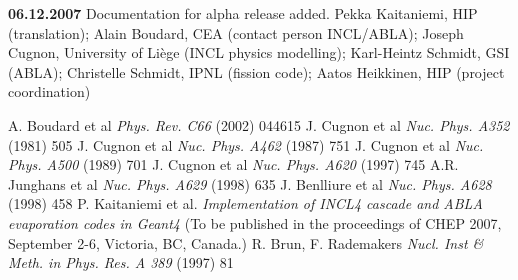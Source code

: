 {\bf 06.12.2007} Documentation for alpha release added. Pekka
Kaitaniemi, HIP (translation); Alain Boudard, CEA (contact person
INCL/ABLA); Joseph Cugnon, University of Li\`ege (INCL physics
modelling); Karl-Heintz Schmidt, GSI (ABLA); Christelle Schmidt, IPNL
(fission code); Aatos Heikkinen, HIP (project coordination)


\begin{thebibliography}{99}



 A. Boudard et al \emph{Phys. Rev. C66} (2002) 044615
 J. Cugnon et al \emph{Nuc. Phys. A352} (1981) 505
 J. Cugnon et al \emph{Nuc. Phys. A462} (1987) 751
 J. Cugnon et al \emph{Nuc. Phys. A500} (1989) 701
 J. Cugnon et al \emph{Nuc. Phys. A620} (1997) 745
 A.R. Junghans et al \emph{Nuc. Phys. A629} (1998) 635
 J. Benlliure et al \emph{Nuc. Phys. A628} (1998) 458
 P. Kaitaniemi et al. \emph{Implementation of
    INCL4 cascade and ABLA evaporation codes in Geant4} (To be
    published in the proceedings of CHEP 2007, September 2-6,
    Victoria, BC, Canada.)
 R. Brun, F. Rademakers \emph{Nucl. Inst \&
    Meth. in Phys. Res. A 389} (1997) 81
\end{thebibliography}
